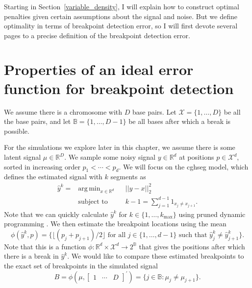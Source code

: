 \documentclass{jsfds} %
\DeclareMathOperator*{\argmin}{arg\,min}
\newcommand{\RR}{\mathbb{R}}
\begin{document}

Starting in Section~\ref{variable_density}, I will explain how to
construct optimal penalties given certain assumptions about the signal
and noise. But we define optimality in terms of breakpoint detection
error, so I will first devote several pages to a precise definition of
the breakpoint detection error.

\section{Properties of an ideal error function for breakpoint detection}
\label{breakpoint_error}

We assume there is a chromosome with $D$ base pairs. Let
$\mathcal X= \{1,\dots,D\}$ be all the base pairs, and let $\mathbb
B=\{1,\dots,D-1\}$ be all bases after which a break is possible.

For the simulations we explore later in this chapter, we assume there
is some latent signal $\mu\in\RR^D$. We sample some noisy signal
$y\in\RR^{d}$ at positions $p\in\mathcal X^{d}$, sorted in increasing
order $p_1<\cdots<p_d$. We will focus on the cghseg model, which
defines the estimated signal with $k$ segments as
\begin{equation}
\label{eq:yhat^k}
\begin{aligned}
\hat y^k = &\argmin_{x\in\RR^d} &&  ||y - x||^2_2
\\
&\text{subject to} && k-1=\sum_{j=1}^{d-1} 1_{x_j\neq x_{j+1}}.
\end{aligned}
\end{equation}
Note that we can quickly calculate $\hat y^k$ for
$k\in\{1,\dots,k_{\text{max}}\}$ using pruned dynamic programming
\citep{pruned-dp}. We then estimate the breakpoint locations using the mean
\begin{equation}
  \label{eq:breaks_phi}
\phi(\hat y^k,p)
= \big\{
\lfloor 
(p_j+p_{j+1})/2
\rfloor
\text{ for all }j\in\{1,\dots,d-1\}\text{ such that }
\hat y^k_j\neq \hat y^k_{j+1}
\big\}.
\end{equation}
Note that this is a function $\phi:\RR^d\times \mathcal X^d\rightarrow
2^{\mathbb B}$ that gives the positions after which there is a break
in $\hat y^k$. We would like to compare these estimated breakpoints to
the exact set of breakpoints in the simulated signal
\begin{equation}
  \label{eq:breaks_B}
  B = \phi\left(\mu,
\left[
  \begin{array}{ccc}
    1 & \cdots & D
  \end{array}
\right]^\prime
\right)
=
\{j\in\mathbb B:\mu_j\neq\mu_{j+1}\}.
\end{equation}
\end{document}
